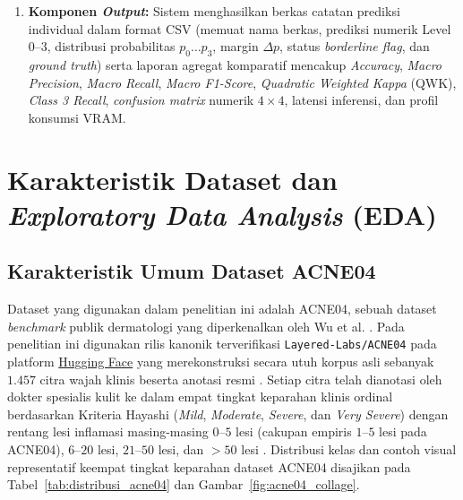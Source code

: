 \begin{enumerate}
    \item \textbf{Komponen \textit{Output}:}
          Sistem menghasilkan berkas catatan prediksi individual dalam format CSV (memuat nama berkas, prediksi numerik Level $0$--$3$, distribusi probabilitas $p_0\ldots p_3$, margin $\Delta p$, status \textit{borderline flag}, dan \textit{ground truth}) serta laporan agregat komparatif mencakup \textit{Accuracy}, \textit{Macro Precision}, \textit{Macro Recall}, \textit{Macro F1-Score}, \textit{Quadratic Weighted Kappa} (QWK), \textit{Class 3 Recall}, \textit{confusion matrix} numerik $4\times 4$, latensi inferensi, dan profil konsumsi VRAM.
\end{enumerate}

\section{Karakteristik Dataset dan \textit{Exploratory Data Analysis} (EDA)}
\label{sec:eda_dataset}

\subsection{Karakteristik Umum Dataset ACNE04}
Dataset yang digunakan dalam penelitian ini adalah ACNE04, sebuah dataset \textit{benchmark} publik dermatologi yang diperkenalkan oleh Wu et al. \cite{wu2019}. Pada penelitian ini digunakan rilis kanonik terverifikasi \texttt{Layered-Labs/ACNE04} pada platform \href{https://huggingface.co/datasets/Layered-Labs/ACNE04}{Hugging Face} yang merekonstruksi secara utuh korpus asli sebanyak $1.457$ citra wajah klinis beserta anotasi resmi \cite{wu2019, layeredlabs2026acne04}. Setiap citra telah dianotasi oleh dokter spesialis kulit ke dalam empat tingkat keparahan klinis ordinal berdasarkan Kriteria Hayashi (\textit{Mild}, \textit{Moderate}, \textit{Severe}, dan \textit{Very Severe}) dengan rentang lesi inflamasi masing-masing $0$--$5$ lesi (cakupan empiris $1$--$5$ lesi pada ACNE04), $6$--$20$ lesi, $21$--$50$ lesi, dan $>50$ lesi \cite{hayashi2008, wu2019}. Distribusi kelas dan contoh visual representatif keempat tingkat keparahan dataset ACNE04 disajikan pada Tabel~\ref{tab:distribusi_acne04} dan Gambar~\ref{fig:acne04_collage}.

